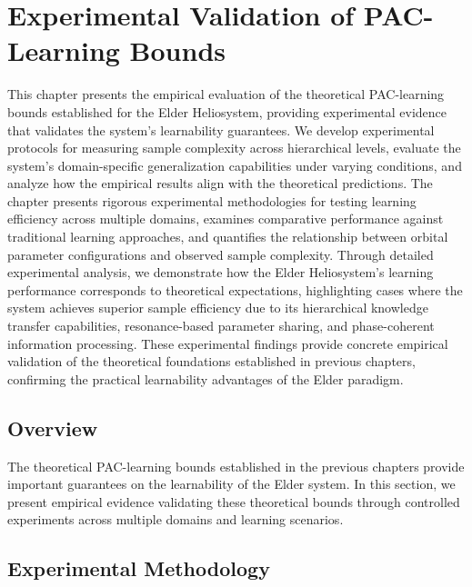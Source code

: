 \chapter{Experimental Validation of PAC-Learning Bounds}

\begin{tcolorbox}[colback=blue!5!white,colframe=blue!75!black,title=Chapter Summary]
This chapter presents the empirical evaluation of the theoretical PAC-learning bounds established for the Elder Heliosystem, providing experimental evidence that validates the system's learnability guarantees. We develop experimental protocols for measuring sample complexity across hierarchical levels, evaluate the system's domain-specific generalization capabilities under varying conditions, and analyze how the empirical results align with the theoretical predictions. The chapter presents rigorous experimental methodologies for testing learning efficiency across multiple domains, examines comparative performance against traditional learning approaches, and quantifies the relationship between orbital parameter configurations and observed sample complexity. Through detailed experimental analysis, we demonstrate how the Elder Heliosystem's learning performance corresponds to theoretical expectations, highlighting cases where the system achieves superior sample efficiency due to its hierarchical knowledge transfer capabilities, resonance-based parameter sharing, and phase-coherent information processing. These experimental findings provide concrete empirical validation of the theoretical foundations established in previous chapters, confirming the practical learnability advantages of the Elder paradigm.
\end{tcolorbox}

\section{Overview}

The theoretical PAC-learning bounds established in the previous chapters provide important guarantees on the learnability of the Elder system. In this section, we present empirical evidence validating these theoretical bounds through controlled experiments across multiple domains and learning scenarios.



\section{Experimental Methodology}

